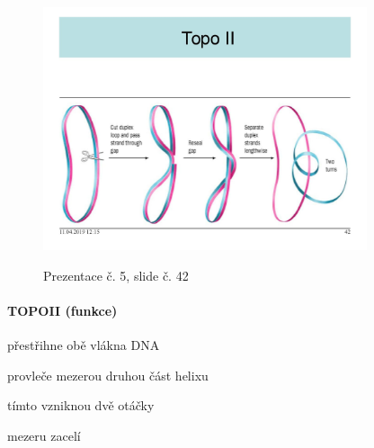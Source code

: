 \documentclass[DIV=8]{scrreprt}
\begin{document}
\begin{figure}
    \caption{Prezentace č. 5, slide č. 42}
    \includegraphics[width=0.85\textwidth]{slides-5/slide-42.jpg}
    \centering
    \label{slides-5-slide-42}
\end{figure}

\paragraph{TOPOII (funkce)}
\begin{myEnumerate}[nosep]
    \item přestřihne obě vlákna DNA
    \item provleče mezerou druhou část helixu
\begin{myItemize}[nosep]
    \item tímto vzniknou dvě otáčky
\end{myItemize}

    \item mezeru zacelí
\end{myEnumerate}
\end{document}
